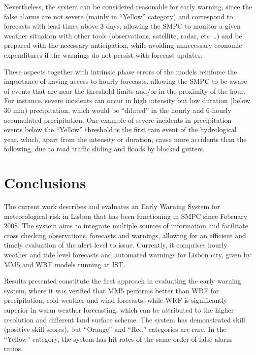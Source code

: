 Nevertheless, the system can be considered reasonable for early warning, since the false alarms are not severe (mainly in “Yellow” category) and correspond to forecasts with lead times above 3 days, allowing the SMPC to monitor a given weather situation with other tools (observations, satellite, radar, etc \ldots) and be prepared with the necessary anticipation, while avoiding unnecessary economic expenditures if the warnings do not persist with forecast updates.

These aspects together with intrinsic phase errors of the models reinforce the importance of having access to hourly forecasts, allowing the SMPC to be aware of events that are near the threshold limits and/or in the proximity of the hour. For instance, severe incidents can occur in high intensity but low duration (below 30 min) precipitation, which would be “diluted” in the hourly and 6-hourly accumulated precipitation. One example of severe incidents in precipitation events below the “Yellow” threshold is the first rain event of the hydrological year, which, apart from the intensity or duration, cause more accidents than the following, due to road traffic sliding and floods by blocked gutters.

\FloatBarrier
\section{Conclusions}

The current work describes and evaluates an Early Warning System for meteorological risk in Lisbon that has been functioning in SMPC since February 2008. The system aims to integrate multiple sources of information and facilitate cross checking observations, forecasts and warnings, allowing for an efficient and timely evaluation of the alert level to issue. Currently, it comprises hourly weather and tide level forecasts and automated warnings for Lisbon city, given by MM5 and WRF models running at IST. 

Results presented constitute the first approach in evaluating the early warning system, where it was verified that MM5 performs better than WRF for precipitation, cold weather and wind forecasts, while WRF is significantly superior in warm weather forecasting, which can be attributed to the higher resolution and different land surface scheme. The system has demonstrated skill (positive skill scores), but “Orange” and “Red” categories are rare. In the “Yellow” category, the system has hit rates of the same order of false alarm ratios.

